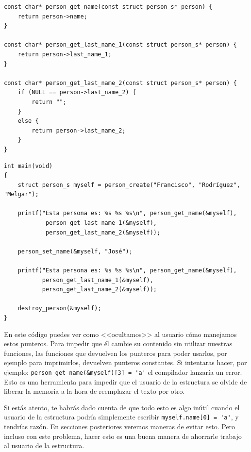 \documentclass[a4paper]{article}
\begin{document}
\noindent
\begin{minipage}[H]{\linewidth}
\mbox{}
\begin{lstlisting}[style=C,
caption={Estructura con punteros constantes -- Funciones de recuperación de información},
label={lst:structConstGetters}]
const char* person_get_name(const struct person_s* person) {
    return person->name;
}

const char* person_get_last_name_1(const struct person_s* person) {
    return person->last_name_1;
}

const char* person_get_last_name_2(const struct person_s* person) {
    if (NULL == person->last_name_2) {
        return "";
    }
    else {
        return person->last_name_2;
    }
}

\end{lstlisting}
\end{minipage}

\noindent
\begin{minipage}[H]{\linewidth}
\mbox{}
\begin{lstlisting}[style=C,
caption={Estructura con punteros constantes -- función \texttt{main}},
label={lst:structConstMain}]
int main(void)
{
    struct person_s myself = person_create("Francisco", "Rodríguez", "Melgar");

    printf("Esta persona es: %s %s %s\n", person_get_name(&myself),
            person_get_last_name_1(&myself),
            person_get_last_name_2(&myself));

    person_set_name(&myself, "José");

    printf("Esta persona es: %s %s %s\n", person_get_name(&myself),
           person_get_last_name_1(&myself),
           person_get_last_name_2(&myself));

    destroy_person(&myself);
}
\end{lstlisting}
\end{minipage}
En este código puedes ver como <<ocultamos>> al usuario cómo manejamos estos
punteros. Para impedir que él cambie su contenido sin utilizar nuestras
funciones, las funciones que devuelven los punteros para poder usarlos, por
ejemplo para imprimirlos, devuelven punteros constantes. Si intentaras hacer,
por ejemplo: \lstinline[style=C]!person_get_name(&myself)[3] = 'a'! el
compilador lanzaría un error. Esto es una herramienta para impedir que el
usuario de la estructura se olvide de liberar la memoria a la hora de reemplazar
el texto por otro.

Si estás atento, te habrás dado cuenta de que todo esto es algo inútil cuando
el usuario de la estructura podría simplemente escribir
\verb!myself.name[0] = 'a'!, y tendrías razón. En secciones posteriores veremos
maneras de evitar esto. Pero incluso con este problema, hacer esto es una buena
manera de ahorrarle trabajo al usuario de la estructura.
\end{document}
